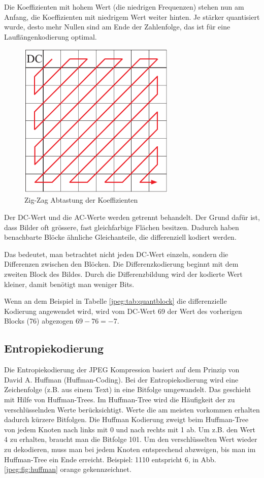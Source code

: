 Die Koeffizienten mit hohem Wert (die niedrigen Frequenzen) stehen nun am Anfang, die Koeffizienten mit niedrigem Wert weiter hinten.
Je stärker quantisiert wurde, desto mehr Nullen sind am Ende der Zahlenfolge, das ist für eine Lauflängenkodierung optimal.

\begin{figure}
    \centering
    \includegraphics[width=75mm]{papers/jpeg/pictures/zigzag.pdf}
    \caption{Zig-Zag Abtastung der Koeffizienten
        \label{jpeg:fig:zigzag}}
\end{figure}

Der DC-Wert und die AC-Werte werden getrennt behandelt.
Der Grund dafür ist, dass Bilder oft grössere, fast gleichfarbige Flächen besitzen.
Dadurch haben benachbarte Blöcke ähnliche Gleichanteile, die differenziell kodiert werden.

Das bedeutet, man betrachtet nicht jeden DC-Wert einzeln, sondern die Differenzen zwischen den Blöcken.
Die Differenzkodierung beginnt mit dem zweiten Block des Bildes.
Durch die Differenzbildung wird der kodierte Wert kleiner, damit benötigt man weniger Bits.

Wenn an dem Beispiel in Tabelle \ref{jpeg:tab:quantblock} die differenzielle Kodierung angewendet wird, wird vom DC-Wert 69 der Wert des vorherigen Blocks (76) abgezogen \(69-76 = -7\).

\subsection{Entropiekodierung
\label{jpeg:subsection:entropiekodierung}}
Die Entropiekodierung der JPEG Kompression basiert auf dem Prinzip von David A. Huffman (Huffman-Coding).
Bei der Entropiekodierung wird eine Zeichenfolge (z.B. aus einem Text) in \mbox{eine} Bitfolge umgewandelt.
Das geschieht mit Hilfe von Huffman-Trees.
Im Huffman-Tree wird die Häufig\-keit der zu verschlüsselnden Werte berücksichtigt.
Werte die am meisten vorkommen \mbox{erhalten} dadurch kürzere Bitfolgen.
Die Huffman Kodierung zweigt beim Huffman-Tree von jedem Knoten nach links mit 0 und nach rechts mit 1 ab.
Um z.B. den Wert 4 zu erhalten, braucht man die Bitfolge 101.
Um den verschlüsselten Wert wieder zu dekodieren, muss man bei jedem Knoten entsprechend abzweigen, bis man im Huffman-Tree ein Ende erreicht. Beispiel: 1110 entspricht 6, in Abb. \ref{jpeg:fig:huffman} orange gekennzeichnet.


